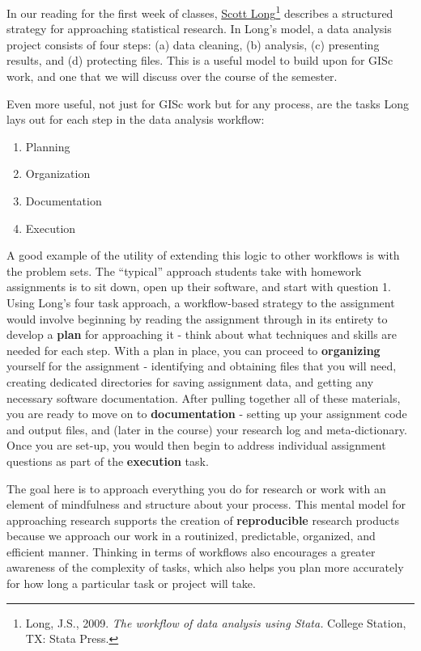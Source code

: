 \documentclass[]{book}
\providecommand{\tightlist}{%
  \setlength{\itemsep}{0pt}\setlength{\parskip}{0pt}}
\let\rmarkdownfootnote\footnote%
\def\footnote{\protect\rmarkdownfootnote}
\begin{document}
In our reading for the first week of classes,
\href{http://www.indiana.edu/~jslsoc/}{Scott Long}\footnote{Long, J.S.,
  2009. \emph{The workflow of data analysis using Stata.} College
  Station, TX: Stata Press.} describes a structured strategy for
approaching statistical research. In Long's model, a data analysis
project consists of four steps: (a) data cleaning, (b) analysis, (c)
presenting results, and (d) protecting files. This is a useful model to
build upon for GISc work, and one that we will discuss over the course
of the semester.

Even more useful, not just for GISc work but for any process, are the
tasks Long lays out for each step in the data analysis workflow:

\begin{enumerate}
\def\labelenumi{\arabic{enumi}.}
\tightlist
\item
  Planning
\item
  Organization
\item
  Documentation
\item
  Execution
\end{enumerate}

A good example of the utility of extending this logic to other workflows
is with the problem sets. The ``typical'' approach students take with
homework assignments is to sit down, open up their software, and start
with question 1. Using Long's four task approach, a workflow-based
strategy to the assignment would involve beginning by reading the
assignment through in its entirety to develop a \textbf{plan} for
approaching it - think about what techniques and skills are needed for
each step. With a plan in place, you can proceed to \textbf{organizing}
yourself for the assignment - identifying and obtaining files that you
will need, creating dedicated directories for saving assignment data,
and getting any necessary software documentation. After pulling together
all of these materials, you are ready to move on to
\textbf{documentation} - setting up your assignment code and output
files, and (later in the course) your research log and meta-dictionary.
Once you are set-up, you would then begin to address individual
assignment questions as part of the \textbf{execution} task.

The goal here is to approach everything you do for research or work with
an element of mindfulness and structure about your process. This mental
model for approaching research supports the creation of
\textbf{reproducible} research products because we approach our work in
a routinized, predictable, organized, and efficient manner. Thinking in
terms of workflows also encourages a greater awareness of the complexity
of tasks, which also helps you plan more accurately for how long a
particular task or project will take.
\end{document}
